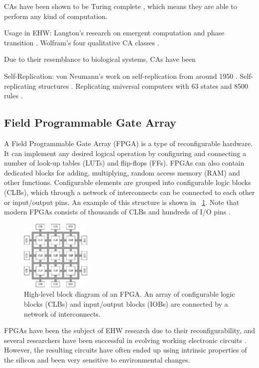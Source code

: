 CAs have been shown to be Turing complete \cite{neumann1966selfreplication, codd1968cellular}, which means they are able to perform any kind of computation.


Usage in EHW:
Langton's research on emergent computation and phase transition \cite{langton1990edgeofchaos}.
Wolfram's four qualitative CA classes \cite{wolfram1984complexity}.

Due to their resemblance to biological systems, CAs have been 

Self-Replication:
von Neumann's work on self-replication from around 1950 \cite{neumann1966selfreplication}.
Self-replicating structures \cite{reggia1998neumann}.
Replicating universal computers with 63 states and 8500 rules \cite{perrier1996toward}.

\subsection{Field Programmable Gate Array}

A Field Programmable Gate Array (FPGA) is a type of reconfigurable hardware.
It can implement any desired logical operation by configuring and connecting a number of look-up tables (LUTs) and flip-flops (FFs).
FPGAs can also contain dedicated blocks for adding, multiplying, random access memory (RAM) and other functions.
Configurable elements are grouped into configurable logic blocks (CLBs), which through a network of interconnects can be connected to each other or input/output pins.
An example of this structure is shown in \figurename~\ref{fig:fpga}.
Note that modern FPGAs consists of thousands of CLBs and hundreds of I/O pins \cite{ds160}.

\begin{figure}[!ht]
    \centering
    \includegraphics[width=0.30\textwidth]{figures/fpga}
    \caption{High-level block diagram of an FPGA. An array of configurable logic blocks (CLBs) and input/output blocks (IOBs) are connected by a network of interconnects.}
    \label{fig:fpga}
\end{figure}

FPGAs have been the subject of EHW research due to their reconfigurability, and several researchers have been successful in evolving working electronic circuits \cite{huelsbergen1998evolution, thompson1997evolved}.
However, the resulting circuits have often ended up using intrinsic properties of the silicon and been very sensitive to environmental changes.

